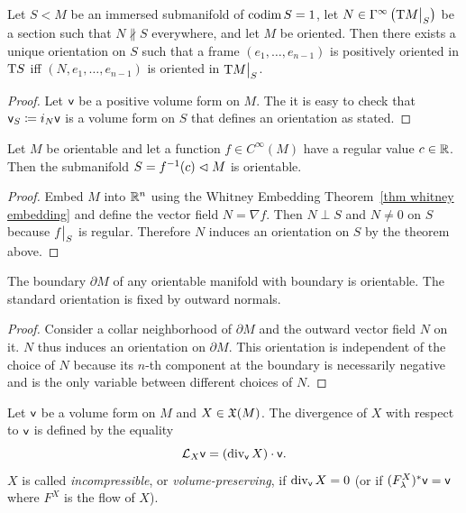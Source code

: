 \begin{thm}\label{thm orientation via normal vector}
Let $S<M$ be an immersed submanifold of $\operatorname{codim} S=1$, let $N\in\Gamma^\infty\left(\restr{\T M}{S}\right)$ be a section such that $N\not\parallel S$ everywhere, and let $M$ be oriented. Then there exists a unique orientation on $S$ such that a frame $(e_1,\ldots,e_{n-1})$ is positively oriented in $\mathrm{T} S$ iff $(N,e_1,\ldots,e_{n-1})$ is oriented in $\restr{\T M}{S}$.
\end{thm}
\begin{proof}
Let $\mathsf{v}$ be a positive volume form on $M$. The it is easy to check that $\mathsf{v}_S\coloneqq i_N \mathsf{v}$ is a volume form on $S$ that defines an orientation as stated.
\end{proof}
\begin{cor}
Let $M$ be orientable and let a function $f\in C^\infty(M)$ have a regular value $c\in \mathbb{R} $. Then the submanifold $S=f^{-1}(c)\vartriangleleft M$ is orientable.
\end{cor}
\begin{proof}
Embed $M$ into $\mathbb{R}^n$ using the Whitney Embedding Theorem~\ref{thm whitney embedding} and define the vector field $N=\nabla f$. Then $N\perp S$ and $N\neq 0$ on $S$ because $\restr{f}{S}$ is regular. Therefore $N$ induces an orientation on $S$ by the theorem above.
\end{proof}
\begin{cor}
The boundary $\partial M$ of any orientable manifold with boundary is orientable. The standard orientation is fixed by outward normals.
\end{cor}
\begin{proof}
Consider a collar neighborhood of $\partial M$ and the outward vector field $N$ on it. $N$ thus induces an orientation on $\partial M$. This orientation is independent of the choice of $N$ because its $n$-th component at the boundary is necessarily negative and is the only variable between different choices of $N$.
\end{proof}


\begin{defn}
Let $\mathsf{v}$ be a volume form on $M$ and $X\in \mathfrak{X}(M)$. The divergence of $X$ with respect to $\mathsf{v}$ is defined by the equality
\[\mathcal{L}_X\mathsf{v} =(\operatorname{div}_{\mathsf{v}} X)\cdot \mathsf{v}.\]
$X$ is called \emph{incompressible}, or \emph{volume-preserving}, if $\operatorname{div}_{\mathsf{v}} X=0$ (or if $(F^X_\lambda)^\ast\mathsf{v}=\mathsf{v}$ where $F^X$ is the flow of $X$).
\end{defn}


